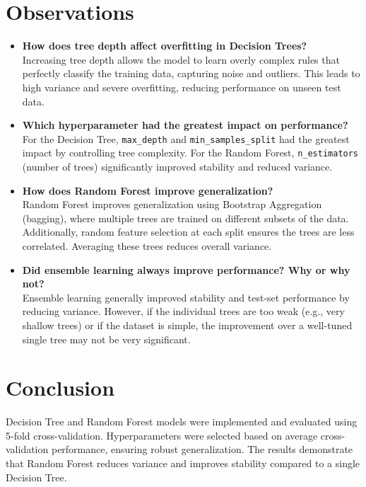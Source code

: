 \documentclass[11pt]{article}
\begin{document}

\section*{Observations}

\begin{itemize}
    \item \textbf{How does tree depth affect overfitting in Decision Trees?} \\
    Increasing tree depth allows the model to learn overly complex rules that perfectly classify the training data, capturing noise and outliers. This leads to high variance and severe overfitting, reducing performance on unseen test data.
    
    \item \textbf{Which hyperparameter had the greatest impact on performance?} \\
    For the Decision Tree, \texttt{max\_depth} and \texttt{min\_samples\_split} had the greatest impact by controlling tree complexity. For the Random Forest, \texttt{n\_estimators} (number of trees) significantly improved stability and reduced variance.
    
    \item \textbf{How does Random Forest improve generalization?} \\
    Random Forest improves generalization using Bootstrap Aggregation (bagging), where multiple trees are trained on different subsets of the data. Additionally, random feature selection at each split ensures the trees are less correlated. Averaging these trees reduces overall variance.
    
    \item \textbf{Did ensemble learning always improve performance? Why or why not?} \\
    Ensemble learning generally improved stability and test-set performance by reducing variance. However, if the individual trees are too weak (e.g., very shallow trees) or if the dataset is simple, the improvement over a well-tuned single tree may not be very significant.
\end{itemize}


\section*{Conclusion}
Decision Tree and Random Forest models were implemented and evaluated using 5-fold cross-validation.  
Hyperparameters were selected based on average cross-validation performance, ensuring robust generalization.  
The results demonstrate that Random Forest reduces variance and improves stability compared to a single Decision Tree.
\end{document}
